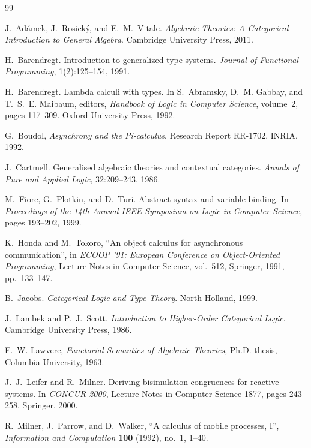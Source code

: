 \documentclass[11pt]{article}
\begin{document}
\begin{thebibliography}{99}

J.~Ad\'amek, J.~Rosick\'y, and E.~M.~Vitale.
\newblock \emph{Algebraic Theories: A Categorical Introduction to General Algebra}.
\newblock Cambridge University Press, 2011.

H.~Barendregt.
\newblock Introduction to generalized type systems.
\newblock \emph{Journal of Functional Programming}, 1(2):125--154, 1991.

H.~Barendregt.
\newblock Lambda calculi with types.
\newblock In S.~Abramsky, D.~M. Gabbay, and T.~S.~E. Maibaum, editors, \emph{Handbook of Logic in Computer Science}, volume~2, pages 117--309. Oxford University Press, 1992.

G.~Boudol,
\emph{Asynchrony and the Pi-calculus},
Research Report RR-1702, INRIA, 1992.

J.~Cartmell.
\newblock Generalised algebraic theories and contextual categories.
\newblock \emph{Annals of Pure and Applied Logic}, 32:209--243, 1986.

M.~Fiore, G.~Plotkin, and D.~Turi.
\newblock Abstract syntax and variable binding.
\newblock In \emph{Proceedings of the 14th Annual IEEE Symposium on Logic in Computer Science}, pages 193--202, 1999.

K.~Honda and M.~Tokoro,
``An object calculus for asynchronous communication'',
in \emph{ECOOP '91: European Conference on Object-Oriented Programming},
Lecture Notes in Computer Science, vol.~512, Springer, 1991, pp.~133--147.

B.~Jacobs.
\newblock \emph{Categorical Logic and Type Theory}.
\newblock North-Holland, 1999.

J.~Lambek and P.~J.~Scott.
\newblock \emph{Introduction to Higher-Order Categorical Logic}.
\newblock Cambridge University Press, 1986.

F.~W. Lawvere,
\emph{Functorial Semantics of Algebraic Theories},
Ph.D. thesis, Columbia University, 1963.

J.~J.~Leifer and R.~Milner.
\newblock Deriving bisimulation congruences for reactive systems.
\newblock In \emph{CONCUR 2000}, Lecture Notes in Computer Science 1877, pages 243--258. Springer, 2000.

R.~Milner, J.~Parrow, and D.~Walker,
``A calculus of mobile processes, I'',
\emph{Information and Computation} \textbf{100} (1992), no.~1, 1--40.


\end{thebibliography}
\end{document}
